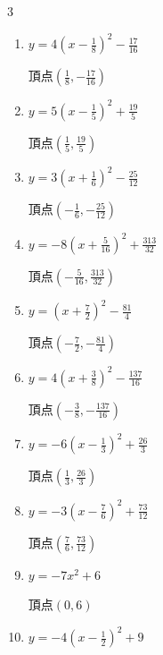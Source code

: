 \begin{multicols}{3}
\begin{enumerate}
        $\displaystyle 頂点\left( -1 , -2 \right)$

\columnbreak %

  \item $\displaystyle y=4\left( x-\frac{1}{8}\right)^{2}-\frac{17}{16}$

        $\displaystyle 頂点\left( \frac{1}{8} , -\frac{17}{16} \right)$

  \item $\displaystyle y=5\left( x-\frac{1}{5}\right)^{2}+\frac{19}{5}$

        $\displaystyle 頂点\left( \frac{1}{5} , \frac{19}{5} \right)$

  \item $\displaystyle y=3\left( x+\frac{1}{6}\right)^{2}-\frac{25}{12}$

        $\displaystyle 頂点\left( -\frac{1}{6} , -\frac{25}{12} \right)$

  \item $\displaystyle y=-8\left( x+\frac{5}{16}\right)^{2}+\frac{313}{32}$

        $\displaystyle 頂点\left( -\frac{5}{16} , \frac{313}{32} \right)$

  \item $\displaystyle y=\left( x+\frac{7}{2}\right)^{2}-\frac{81}{4}$

        $\displaystyle 頂点\left( -\frac{7}{2} , -\frac{81}{4} \right)$

  \item $\displaystyle y=4\left( x+\frac{3}{8}\right)^{2}-\frac{137}{16}$

        $\displaystyle 頂点\left( -\frac{3}{8} , -\frac{137}{16} \right)$

  \item $\displaystyle y=-6\left( x-\frac{1}{3}\right)^{2}+\frac{26}{3}$

        $\displaystyle 頂点\left( \frac{1}{3} , \frac{26}{3} \right)$

  \item $\displaystyle y=-3\left( x-\frac{7}{6}\right)^{2}+\frac{73}{12}$

        $\displaystyle 頂点\left( \frac{7}{6} , \frac{73}{12} \right)$

  \item $\displaystyle y=-7x^{2}+6$

        $\displaystyle 頂点\left( 0 , 6 \right)$

  \item $\displaystyle y=-4\left( x-\frac{1}{2}\right)^{2}+9$


\end{enumerate}
\end{multicols}

